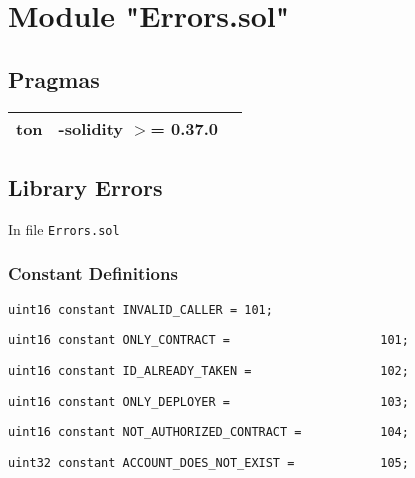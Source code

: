 
\section{Module "Errors.sol"}


\subsection{Pragmas}


\noindent\begin{tabular}{|l|l|p{5cm}|}\hline
ton & -solidity $>$= 0.37.0 &\\\hline
\end{tabular}


\subsection{Library Errors}

\minitoc

In file {\tt Errors.sol}

\subsubsection{Constant Definitions}


\begin{lstlisting}[firstnumber=4]
    uint16 constant INVALID_CALLER = 101;
\end{lstlisting}

\begin{lstlisting}[firstnumber=6]
    uint16 constant ONLY_CONTRACT =                     101;
\end{lstlisting}

\begin{lstlisting}[firstnumber=7]
    uint16 constant ID_ALREADY_TAKEN =                  102;
\end{lstlisting}

\begin{lstlisting}[firstnumber=8]
    uint16 constant ONLY_DEPLOYER =                     103;
\end{lstlisting}

\begin{lstlisting}[firstnumber=9]
    uint16 constant NOT_AUTHORIZED_CONTRACT =           104;
\end{lstlisting}

\begin{lstlisting}[firstnumber=10]
    uint32 constant ACCOUNT_DOES_NOT_EXIST =            105;
\end{lstlisting}

